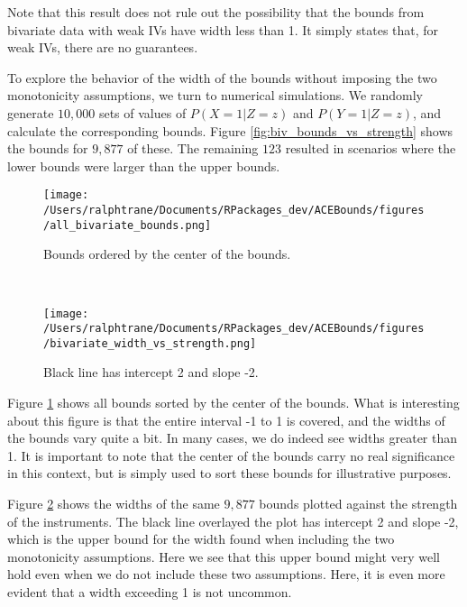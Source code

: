 \documentclass[
]{article}
\theoremstyle{plain}
\begin{document}
Note that this result does not rule out the possibility that the bounds from bivariate data with weak IVs have width less than 1. It simply states that, for weak IVs, there are no guarantees.

To explore the behavior of the width of the bounds without imposing the two monotonicity assumptions, we turn to numerical simulations. We randomly generate \(10,000\) sets of values of \(P(X = 1 | Z = z)\) and \(P(Y = 1 | Z = z)\), and calculate the corresponding bounds. Figure \ref{fig:biv_bounds_vs_strength} shows the bounds for \(9,877\) of these. The remaining \(123\) resulted in scenarios where the lower bounds were larger than the upper bounds.

\begin{figure*}
  \centering
  \begin{subfigure}[t]{0.5\textwidth}
    \centering
    \texttt{[image: /Users/ralphtrane/Documents/RPackages\_dev/ACEBounds/figures/all\_bivariate\_bounds.png]}
    \caption{Bounds ordered by the center of the bounds.}
    \label{fig:all_biv_bounds}
  \end{subfigure}%
  ~
  \begin{subfigure}[t]{0.5\textwidth}
    \texttt{[image: /Users/ralphtrane/Documents/RPackages\_dev/ACEBounds/figures/bivariate\_width\_vs\_strength.png]}
    \caption{Black line has intercept 2 and slope -2.}
    \label{fig:biv_width_vs_strength}
  \end{subfigure}
  \caption{10,000 values for bivariate distributions were randomly generated such that no constraints were violated. Of these, 123 resulted in bounds where the lower bound was greater than the upper bounds. These have been removed from these plots.}
  \label{fig:biv_bounds_vs_strength}
\end{figure*}

Figure \ref{fig:all_biv_bounds} shows all bounds sorted by the center of the bounds. What is interesting about this figure is that the entire interval -1 to 1 is covered, and the widths of the bounds vary quite a bit. In many cases, we do indeed see widths greater than 1. It is important to note that the center of the bounds carry no real significance in this context, but is simply used to sort these bounds for illustrative purposes.

Figure \ref{fig:biv_width_vs_strength} shows the widths of the same \(9,877\) bounds plotted against the strength of the instruments. The black line overlayed the plot has intercept 2 and slope -2, which is the upper bound for the width found when including the two monotonicity assumptions. Here we see that this upper bound might very well hold even when we do not include these two assumptions. Here, it is even more evident that a width exceeding 1 is not uncommon.
\end{document}
